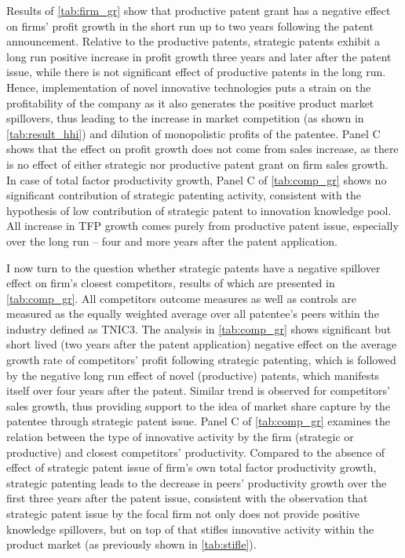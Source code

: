\documentclass[11pt]{article}
\begin{document}
Results of \autoref{tab:firm_gr} show that productive patent grant has a negative effect on firms’ profit growth in the short run up to two years following the patent announcement. Relative to the productive patents, strategic patents exhibit a long run positive increase in profit growth three years and later after the patent issue, while there is not significant effect of productive patents in the long run. Hence, implementation of novel innovative technologies puts a strain on the profitability of the company as it also generates the positive product market spillovers, thus leading to the increase in market competition (as shown in \autoref{tab:result_hhi}) and dilution of monopolistic profits of the patentee. Panel C shows that the effect on profit growth does not come from sales increase, as there is no effect of either strategic nor productive patent grant on firm sales growth.
In case of total factor productivity growth, Panel C of \autoref{tab:comp_gr} shows no significant contribution of strategic patenting activity, consistent with the hypothesis of low contribution of strategic patent to innovation knowledge pool. All increase in TFP growth comes purely from productive patent issue, especially over the long run – four and more years after the patent application. 

I now turn to the question whether strategic patents have a negative spillover effect on firm’s closest competitors, results of which are presented in \autoref{tab:comp_gr}. All competitors outcome measures as well as controls are measured as the equally weighted average over all patentee’s peers within the industry defined as TNIC3.  The analysis in  \autoref{tab:comp_gr} shows significant but short lived (two years after the patent application) negative effect on the average growth rate of competitors’ profit following strategic patenting, which is followed by the negative long run effect of novel (productive) patents, which manifests itself over four years after the patent. Similar trend is observed for competitors’ sales growth, thus providing support to the idea of market share capture by the patentee through strategic patent issue. 
Panel C of \autoref{tab:comp_gr} examines the relation between the type of innovative activity by the firm (strategic or productive) and closest competitors’ productivity. Compared to the absence of effect of strategic patent issue of firm’s own total factor productivity growth, strategic patenting leads to the decrease in peers’ productivity growth over the first three years after the patent issue, consistent with the observation that strategic patent issue by the focal firm not only does not provide positive knowledge spillovers, but on top of that stifles innovative activity within the product market (as previously shown in  \autoref{tab:stifle}).
\end{document}
